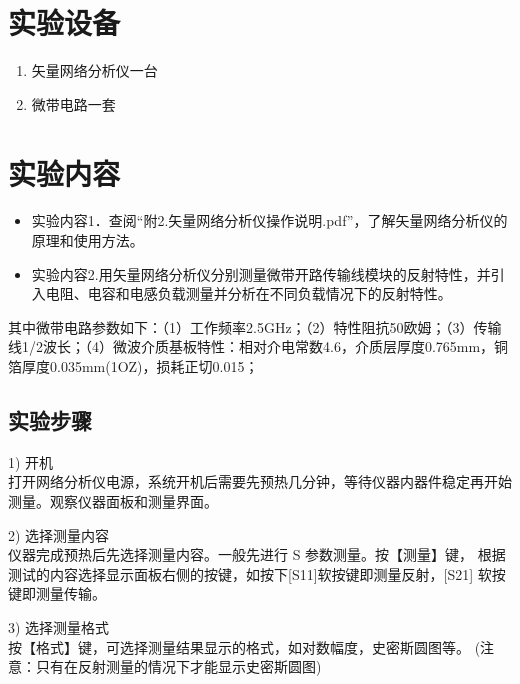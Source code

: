 \documentclass[12pt,hyperref,a4paper,UTF8]{ctexart}
\begin{document}
\section{实验设备}
\begin{enumerate}[itemsep=-5pt, topsep=0pt, partopsep=0pt]
    \item 矢量网络分析仪一台
    \item 微带电路一套
\end{enumerate}




\section{实验内容}
\begin{itemize}[itemsep=-5pt, topsep=0pt, partopsep=0pt]
        \item 实验内容1．查阅“附2.矢量网络分析仪操作说明.pdf”，了解矢量网络分析仪的原理和使用方法。
        \item 实验内容2.用矢量网络分析仪分别测量微带开路传输线模块的反射特性，并引入电阻、电容和电感负载测量并分析在不同负载情况下的反射特性。
\end{itemize}


其中微带电路参数如下：（1）工作频率2.5GHz；（2）特性阻抗50欧姆；（3）传输线1/2波长；（4）微波介质基板特性：相对介电常数4.6，介质层厚度0.765mm，铜箔厚度0.035mm(1OZ)，损耗正切0.015；

\subsection*{实验步骤}

1) 开机\\
打开网络分析仪电源，系统开机后需要先预热几分钟，等待仪器内器件稳定再开始测量。观察仪器面板和测量界面。


 2) 选择测量内容\\
仪器完成预热后先选择测量内容。一般先进行 S 参数测量。按【测量】键， 根据测试的内容选择显示面板右侧的按键，如按下[S11]软按键即测量反射，[S21] 软按键即测量传输。


 3) 选择测量格式\\
按【格式】键，可选择测量结果显示的格式，如对数幅度，史密斯圆图等。
(注意：只有在反射测量的情况下才能显示史密斯圆图) 
\end{document}
